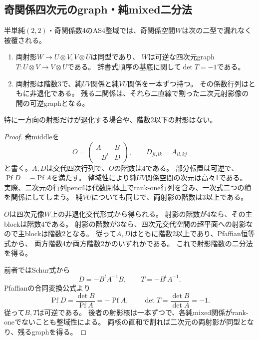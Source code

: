 \subsection{奇関係四次元のgraph・純mixed二分法}
\label{subsec:h3-order2-22-rank4-odd-graph}
\begin{proposition}\label{prop:h3-order2-22-rank4-odd-dichotomy}
半単純$(2,2)$・奇関係数4のAS4整域では、奇関係空間$W$は次の二型で漏れなく被覆される。
\begin{enumerate}
\item 両射影$W\to U\otimes V,V\otimes U$は同型であり、
$W$は可逆な四次元graph $T:U\otimes V\to V\otimes U$である。
辞書式順序の基底に関して$\det T=-1$である。
\item 両射影は階数3で、純$UV$関係と純$VU$関係を一本ずつ持つ。
その係数行列はともに非退化である。
残る二関係は、それら二直線で割った二次元射影像の間の可逆graphとなる。
\end{enumerate}
特に一方向の射影だけが退化する場合や、階数2以下の射影はない。
\end{proposition}
\begin{proof}
奇middleを
\[
 O=\begin{pmatrix}A&B\\-B^t&D\end{pmatrix},\qquad
 D_{ji,lk}=A_{il,kj}
\]
と書く。$A,D$は交代四次行列で、$O$の階数は4である。
部分転置は可逆で、$\operatorname{Pf}D=-\operatorname{Pf}A$を満たす。
整域性により純$UV$関係空間の次元は高々1である。
実際、二次元の行列pencilは代数閉体上でrank-one行列を含み、一次式二つの積を関係にしてしまう。
純$VU$についても同じで、両射影の階数は3以上である。

$O$は四次元像$W$上の非退化交代形式から得られる。
射影の階数が4なら、その主blockは階数4である。
射影の階数が3なら、四次元交代空間の超平面への射影なので主blockは階数2となる。
従って$A,D$はともに階数2以上であり、Pfaffian恒等式から、
両方階数4か両方階数2かのいずれかである。
これで射影階数の二分法を得る。

前者ではSchur式から
\[
 D=-B^tA^{-1}B,\qquad T=-B^tA^{-1}.
\]
Pfaffianの合同変換公式より
\[
 \operatorname{Pf}D=\frac{\det B}{\operatorname{Pf}A}
 =-\operatorname{Pf}A,
 \qquad \det T=\frac{\det B}{\det A}=-1.
\]
従って$B,T$は可逆である。
後者の射影核は一本ずつで、各純mixed関係がrank-oneでないことも整域性による。
両核の直和で割れば二次元の両射影が同型となり、残るgraphを得る。
\end{proof}

